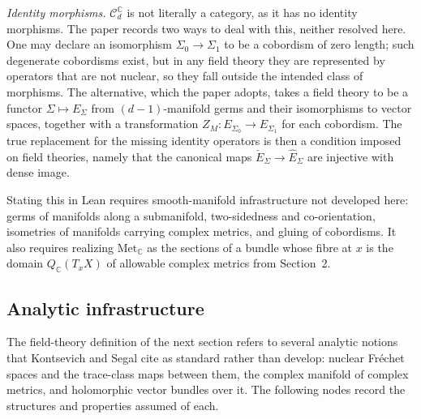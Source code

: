 \begin{definition}
  \emph{Identity morphisms.} $\mathcal C_d^{\mathbb C}$ is not literally a
  category, as it has no identity morphisms. The paper records two ways to
  deal with this, neither resolved here. One may declare an isomorphism
  $\Sigma_0 \to \Sigma_1$ to be a cobordism of zero length; such degenerate
  cobordisms exist, but in any field theory they are represented by operators
  that are not nuclear, so they fall outside the intended class of morphisms.
  The alternative, which the paper adopts, takes a field theory to be a
  functor $\Sigma \mapsto E_{\Sigma}$ from $(d-1)$-manifold germs and their
  isomorphisms to vector spaces, together with a transformation
  $Z_M : E_{\Sigma_0} \to E_{\Sigma_1}$ for each cobordism. The true
  replacement for the missing identity operators is then a condition imposed
  on field theories, namely that the canonical maps
  $\check E_{\Sigma} \to \hat E_{\Sigma}$ are injective with dense image.

  Stating this in Lean requires smooth-manifold infrastructure not developed
  here: germs of manifolds along a submanifold, two-sidedness and
  co-orientation, isometries of manifolds carrying complex metrics, and gluing
  of cobordisms. It also requires realizing $\mathrm{Met}_{\mathbb C}$ as the
  sections of a bundle whose fibre at $x$ is the domain $Q_{\mathbb C}(T_x X)$
  of allowable complex metrics from Section~2.
\end{definition}

\subsection{Analytic infrastructure}

The field-theory definition of the next section refers to several analytic
notions that Kontsevich and Segal cite as standard rather than develop: nuclear
Fréchet spaces and the trace-class maps between them, the complex manifold of
complex metrics, and holomorphic vector bundles over it. The following nodes
record the structures and properties assumed of each.

